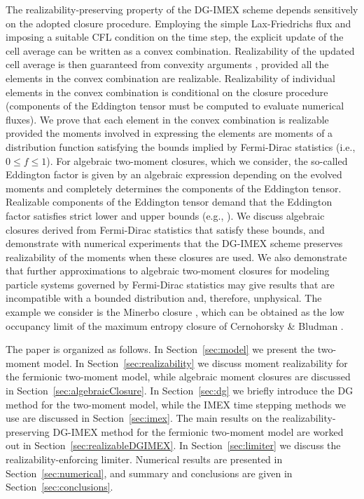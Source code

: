 The realizability-preserving property of the DG-IMEX scheme depends sensitively on the adopted closure procedure.  
Employing the simple Lax-Friedrichs flux and imposing a suitable CFL condition on the time step, the explicit update of the cell average can be written as a convex combination.  
Realizability of the updated cell average is then guaranteed from convexity arguments \cite{zhangShu_2010a}, provided all the elements in the convex combination are realizable.  
Realizability of individual elements in the convex combination is conditional on the closure procedure (components of the Eddington tensor must be computed to evaluate numerical fluxes).  
We prove that each element in the convex combination is realizable provided the moments involved in expressing the elements are moments of a distribution function satisfying the bounds implied by Fermi-Dirac statistics (i.e., $0\le f \le 1$).  
For algebraic two-moment closures, which we consider, the so-called Eddington factor is given by an algebraic expression depending on the evolved moments and completely determines the components of the Eddington tensor.  
Realizable components of the Eddington tensor demand that the Eddington factor satisfies strict lower and upper bounds (e.g., \cite{levermore_1984,lareckiBanach_2011}).  
We discuss algebraic closures derived from Fermi-Dirac statistics that satisfy these bounds, and demonstrate with numerical experiments that the DG-IMEX scheme preserves realizability of the moments when these closures are used.  
We also demonstrate that further approximations to algebraic two-moment closures for modeling particle systems governed by Fermi-Dirac statistics may give results that are incompatible with a bounded distribution and, therefore, unphysical.  
The example we consider is the Minerbo closure \cite{minerbo_1978}, which can be obtained as the low occupancy limit of the maximum entropy closure of Cernohorsky \& Bludman \cite{cernohorskyBludman_1994}.  

The paper is organized as follows.  
In Section~\ref{sec:model} we present the two-moment model.  
In Section~\ref{sec:realizability} we discuss moment realizability for the fermionic two-moment model, while algebraic moment closures are discussed in Section~\ref{sec:algebraicClosure}.  
In Section~\ref{sec:dg} we briefly introduce the DG method for the two-moment model, while the IMEX time stepping methods we use are discussed in Section~\ref{sec:imex}.  
The main results on the realizability-preserving DG-IMEX method for the fermionic two-moment model are worked out in Section~\ref{sec:realizableDGIMEX}.  
In Section~\ref{sec:limiter} we discuss the realizability-enforcing limiter.  
Numerical results are presented in Section~\ref{sec:numerical}, and summary and conclusions are given in Section~\ref{sec:conclusions}.  
